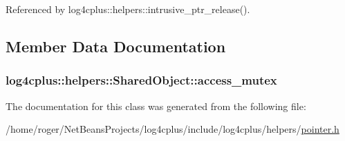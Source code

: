 Referenced by log4cplus\-::helpers\-::intrusive\-\_\-ptr\-\_\-release().



\subsection{Member Data Documentation}
\hypertarget{classlog4cplus_1_1helpers_1_1SharedObject_af7d354228772d3bb7daab8bd9cbfe934}{
\subsubsection[{access\-\_\-mutex}]{ log4cplus\-::helpers\-::\-Shared\-Object\-::access\-\_\-mutex}}\label{classlog4cplus_1_1helpers_1_1SharedObject_af7d354228772d3bb7daab8bd9cbfe934}


The documentation for this class was generated from the following file\-:\begin{DoxyCompactItemize}
\item 
/home/roger/\-Net\-Beans\-Projects/log4cplus/include/log4cplus/helpers/\hyperlink{pointer_8h}{pointer.\-h}\end{DoxyCompactItemize}
